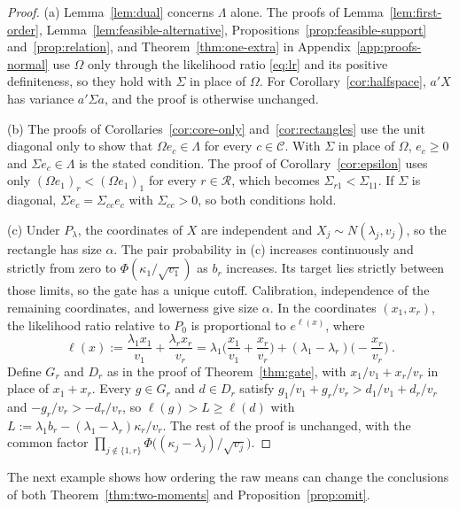 \documentclass[11pt]{article}
\newcommand{\red}[1]{{\color{red}#1}} %
\numberwithin{equation}{section}
\theoremstyle{definition}
\begin{document}
\begin{proof}
(a) Lemma~\ref{lem:dual} concerns $\Lambda$ alone. The proofs of Lemma~\ref{lem:first-order}, Lemma~\ref{lem:feasible-alternative}, Propositions~\ref{prop:feasible-support} and~\ref{prop:relation}, and Theorem~\ref{thm:one-extra} in Appendix~\ref{app:proofs-normal} use $\Omega$ only through the likelihood ratio \eqref{eq:lr} and its positive definiteness, so they hold with $\Sigma$ in place of $\Omega$. For Corollary~\ref{cor:halfspace}, $a'X$ has variance $a'\Sigma a$, and the proof is otherwise unchanged.

(b) The proofs of Corollaries~\ref{cor:core-only} and~\ref{cor:rectangles} use the unit diagonal only to show that $\Omega e_c\in\Lambda$ for every $c\in\mathcal C$. With $\Sigma$ in place of $\Omega$, $e_c\ge0$ and $\Sigma e_c\in\Lambda$ is the stated condition. The proof of Corollary~\ref{cor:epsilon} uses only $(\Omega e_1)_r<(\Omega e_1)_1$ for every $r\in\mathcal R$, which becomes $\Sigma_{r1}<\Sigma_{11}$. If $\Sigma$ is diagonal, $\Sigma e_c=\Sigma_{cc}e_c$ with $\Sigma_{cc}>0$, so both conditions hold.

(c) Under $P_\lambda$, the coordinates of $X$ are independent and $X_j\sim N(\lambda_j,v_j)$, \red{so the rectangle has size $\alpha$. The pair probability in (c) increases continuously and strictly from zero to $\Phi(\kappa_1/\sqrt{v_1})$ as $b_r$ increases. Its target lies strictly between those limits, so the gate has a unique cutoff. Calibration, independence of the remaining coordinates, and lowerness give size $\alpha$.} In the coordinates $(x_1,x_r)$, the likelihood ratio relative to $P_0$ is proportional to $e^{\ell(x)}$, where
\[
\ell(x):=\frac{\lambda_1x_1}{v_1}+\frac{\lambda_rx_r}{v_r}=\lambda_1\Big(\frac{x_1}{v_1}+\frac{x_r}{v_r}\Big)+(\lambda_1-\lambda_r)\Big(-\frac{x_r}{v_r}\Big)~.
\]
Define $G_r$ and $D_r$ as in the proof of Theorem~\ref{thm:gate}, with $x_1/v_1+x_r/v_r$ in place of $x_1+x_r$. Every $g\in G_r$ and $d\in D_r$ satisfy $g_1/v_1+g_r/v_r>d_1/v_1+d_r/v_r$ and $-g_r/v_r>-d_r/v_r$, so $\ell(g)>L\ge\ell(d)$ with $L:=\lambda_1b_r-(\lambda_1-\lambda_r)\kappa_r/v_r$. The rest of the proof is unchanged, with the common factor $\prod_{j\notin\{1,r\}}\Phi\big((\kappa_j-\lambda_j)/\sqrt{v_j}\big)$.
\end{proof}

\red{The next example shows how ordering the raw means can change the conclusions of both Theorem~\ref{thm:two-moments} and Proposition~\ref{prop:omit}.}
\end{document}
